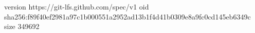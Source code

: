 version https://git-lfs.github.com/spec/v1
oid sha256:f89f40ef2981a97c1b000551a2952ad13b1f4d41b0309e8a9fc0cd145eb6349c
size 349692
